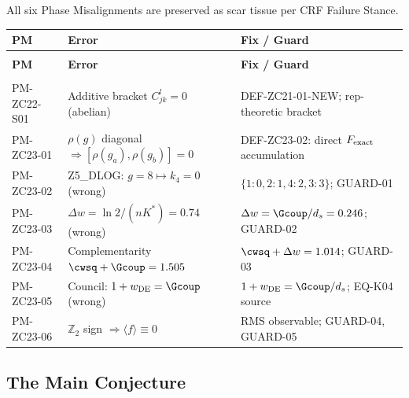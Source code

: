 \documentclass[12pt, a4paper]{article}
\begin{document}
All six Phase Misalignments are preserved as scar tissue per CRF
Failure Stance.

\begin{formalbox}[title={PM-ZC23-01 through PM-ZC23-06 (Scar Tissue)}]
{\small
\setlength{\LTpre}{2pt}\setlength{\LTpost}{2pt}
\renewcommand{\arraystretch}{1.30}
\begin{longtable}{>{\raggedright\arraybackslash}p{2.6cm}
                  >{\raggedright\arraybackslash}p{5.2cm}
                  >{\raggedright\arraybackslash}p{4.6cm}}
\toprule
\textbf{PM} & \textbf{Error} & \textbf{Fix / Guard} \\
\midrule
\endfirsthead
\multicolumn{3}{l}{\small\textit{(continued)}}\\[2pt]
\toprule
\textbf{PM} & \textbf{Error} & \textbf{Fix / Guard} \\
\midrule
\endhead
\midrule
\multicolumn{3}{r}{\small\textit{(continues)}}\\
\endfoot
\bottomrule
\endlastfoot
PM-ZC22-S01
  & Additive bracket $C^l_{jk}=0$ (abelian)
  & DEF-ZC21-01-NEW; rep-theoretic bracket \\[2pt]
PM-ZC23-01
  & $\rho(g)$ diagonal $\Rightarrow [\rho(g_a),\rho(g_b)]=0$
  & DEF-ZC23-02: direct $F_{\rm exact}$ accumulation \\[2pt]
PM-ZC23-02
  & Z5\_DLOG: $g=8 \mapsto k_4=0$ (wrong)
  & $\{1:0,2:1,4:2,3:3\}$; GUARD-01 \\[2pt]
PM-ZC23-03
  & $\Delta w = \ln2/(nK^*) = 0.74$ (wrong)
  & $\Delta w = \Gcoup/d_s = 0.246$; GUARD-02 \\[2pt]
PM-ZC23-04
  & Complementarity $\cwsq + \Gcoup = 1.505$
  & $\cwsq + \Delta w = 1.014$; GUARD-03 \\[2pt]
PM-ZC23-05
  & Council: $1+w_{\rm DE}=\Gcoup$ (wrong)
  & $1+w_{\rm DE}=\Gcoup/d_s$; EQ-K04 source \\[2pt]
PM-ZC23-06
  & $\mathbb{Z}_2$ sign $\Rightarrow \langle f\rangle\equiv 0$
  & RMS observable; GUARD-04, GUARD-05 \\
\end{longtable}
}
\end{formalbox}

\subsection{The Main Conjecture}
\label{zc23:sec:conjecture}
\end{document}
